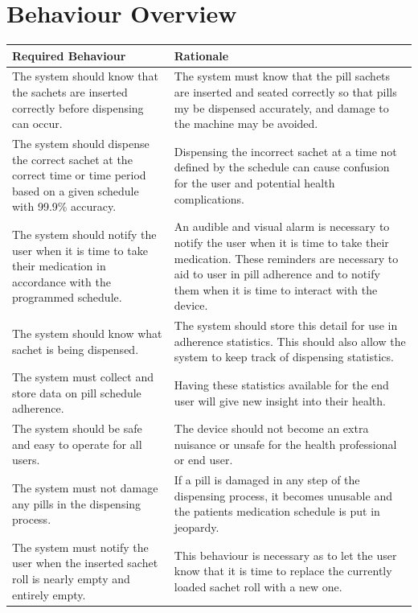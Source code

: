 \documentclass[12pt,titlepage]{article}
\begin{document}
\section{Behaviour Overview}

\begin{table}[htb!]
\begin{center}
\begin{adjustbox}{max width=.9\textwidth}
\small
\begin{tabular}{|p{}|p{}|}
 \hline
 \textbf{Required Behaviour} & \textbf{Rationale} \\
 \hline
 The system should know that the sachets are inserted correctly before dispensing can occur.  & The system must know that the pill sachets are inserted and seated correctly so that pills my be dispensed accurately, and damage to the machine may be avoided.\\
 \hline 
 The system should dispense the correct sachet at the correct time or time period based on a given schedule with 99.9\% accuracy. &

 Dispensing the incorrect sachet at a time not defined by the schedule can cause confusion for the user and potential health complications.\\
 \hline
 The system should notify the user when it is time to take their medication in accordance with the programmed schedule.
   &  An audible and visual alarm is necessary to notify the user when it is time to take their medication. These reminders are necessary to aid to user in pill adherence and to notify them when it is time to interact with the device.
 \\
 \hline
 The system should know what sachet is being dispensed. &
 The system should store this detail for use in adherence statistics. This should also allow the system to keep track of dispensing statistics.\\
 \hline
 The system must collect and store data on pill schedule adherence. & 
 Having these statistics available for the end user will give new insight into their health.\\
 \hline
 The system should be safe and easy to operate for all users. &
 The device should not become an extra nuisance or unsafe for the health professional or end user. \\
 \hline
 The system must not damage any pills in the dispensing process. &
 If a pill is damaged in any step of the dispensing process, it becomes unusable and the patients medication schedule is put in jeopardy.\\
 \hline
  The system must notify the user when the inserted sachet roll is nearly empty and entirely empty. & This behaviour is necessary as to let the user know that it is time to replace the currently loaded sachet roll with a new one.\\
  \hline
 

\end{tabular}
\end{adjustbox}
\end{center}
\end{table}
\end{document}
